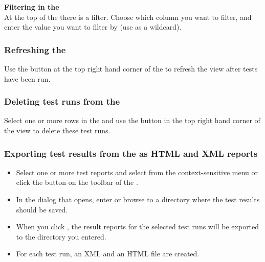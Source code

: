 \textbf{Filtering in the \gdtestsummaryview}\\

At the top of the \gdtestsummaryview{} there is a filter. Choose which column you want to filter, and enter the value you want to filter by (use \bxshell{*} as a wildcard). 


\subsubsection{Refreshing the \gdtestsummaryview{}}

Use the  button at the top right hand corner of the \gdtestsummaryview{} to refresh the view after tests have been run. 

\subsubsection{Deleting test runs from the \gdtestsummaryview{}}
\label{TestSummaryDelete}
Select one or more rows in the \gdtestsummaryview{} and use the  button in the top right hand corner of the view to delete these test runs. 


\subsubsection{Exporting test results from the \gdtestsummaryview{} as HTML and XML reports}
\label{TestSummaryExport}

\begin{itemize}
\item Select one or more test reports and select  from the context-sensitive menu or click the  button on the toolbar of the \gdtestsummaryview{}.
\item In the dialog that opens, enter or browse to a directory where the test results should be saved. 
\item When you click , the result reports for the selected test runs will be exported to the directory you entered.
\item For each test run, an XML and an HTML file are created. 
\end{itemize}

